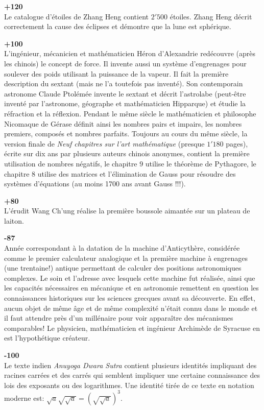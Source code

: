 \textbf{+120}\\
Le catalogue d'étoiles de Zhang Heng contient $2'500$ étoiles. Zhang Heng décrit correctement la cause des éclipses et démontre que la lune est sphérique.

\textbf{+100}\\
L'ingénieur, mécanicien et mathématicien Héron d'Alexandrie redécouvre (après les chinois) le concept de force. Il invente aussi un système d'engrenages pour soulever des poids utilisant la puissance de la vapeur. Il fait la première description du sextant (mais ne l'a toutefois pas inventé). Son contemporain astronome Claude Ptolémée invente le sextant et décrit l'astrolabe (peut-être inventé par l'astronome, géographe et mathématicien Hipparque) et étudie la réfraction et la réflexion. Pendant le même siècle le mathématicien et philosophe Nicomaque de Gérase définit ainsi les nombres pairs et impairs, les nombres premiers, composés et nombres parfaits.  Toujours au cours du même siècle, la version finale de \textit{Neuf chapitres sur l'art mathématique} (presque $1'180$ pages), écrite sur dix ans par plusieurs auteurs chinois anonymes, contient la première utilisation de nombres négatifs, le chapitre $9$ utilise le théorème de Pythagore, le chapitre $8$ utilise des matrices et l'élimination de Gauss pour résoudre des systèmes d'équations (au moins 1700 ans avant Gauss !!!).

\textbf{+80}\\
L'érudit Wang Ch'ung réalise la première boussole aimantée sur un plateau de laiton.

\textbf{-87}\\
Année correspondant à la datation de la machine d'Anticythère, considérée comme le premier calculateur analogique et la première machine à engrenages (une trentaine!) antique permettant de calculer des positions astronomiques complexes. Le soin et l'adresse avec lesquels cette machine fut réalisée, ainsi que les capacités nécessaires en mécanique et en astronomie remettent en question les connaissances historiques sur les sciences grecques avant sa découverte. En effet, aucun objet de même âge et de même complexité n'était connu dans le monde et il faut attendre près d'un millénaire pour voir apparaître des mécanismes comparables! Le physicien, mathématicien et ingénieur Archimède de Syracuse en est l'hypothétique créateur.

\textbf{-100}\\
Le texte indien \textit{Anuyoga Dwara Sutra} contient plusieurs identités impliquant des racines carrées et des carrés qui semblent impliquer une certaine connaissance des lois des exposants ou des logarithmes. Une identité tirée de ce texte en notation moderne est: $ \sqrt{a}\sqrt{\sqrt {a}} = (\sqrt{\sqrt{a}})^3$.

